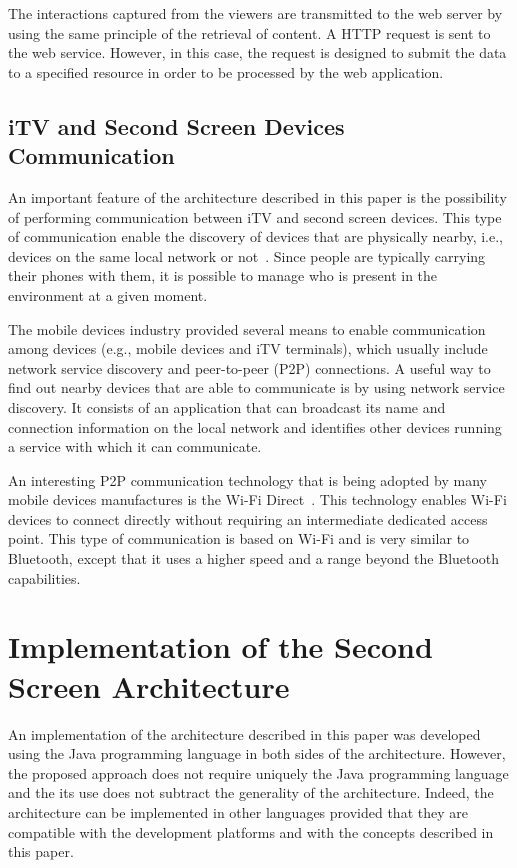 \documentclass[journal]{IEEEtran}
\begin{document}
The interactions captured from the viewers are transmitted to the web server by using the same principle of the retrieval of content. A HTTP request is sent to the web service. However, in this case, the request is designed to submit the data to a specified resource in order to be processed by the web application.

\subsection{iTV and Second Screen Devices Communication}

An important feature of the architecture described in this paper is the possibility of performing communication between iTV and second screen devices. This type of communication enable the discovery of devices that are physically nearby, i.e., devices on the same local network or not~\cite{Hellman2013}. Since people are typically carrying their phones with them, it is possible to manage who is present in the environment at a given moment.

The mobile devices industry provided several means to enable communication among devices (e.g., mobile devices and iTV terminals), which usually include network service discovery and peer-to-peer (P2P) connections. A useful way to find out nearby devices that are able to communicate is by using network service discovery. It consists of an application that can broadcast its name and connection information on the local network and identifies other devices running a service with which it can communicate.

An interesting P2P communication technology that is being adopted by many mobile devices manufactures is the Wi-Fi Direct~\cite{Hellman2013}. This technology enables Wi-Fi devices to connect directly without requiring an intermediate dedicated access point. This type of communication is based on Wi-Fi and is very similar to Bluetooth, except that it uses a higher speed and a range beyond the Bluetooth capabilities.


\section{Implementation of the Second Screen Architecture}
\label{sec_implementation}

An implementation of the architecture described in this paper was developed using the Java programming language in both sides of the architecture. However, the proposed approach does not require uniquely the Java programming language and the its use does not subtract the generality of the architecture. Indeed, the architecture can be implemented in other languages provided that they are compatible with the development platforms and with the concepts described in this paper.
\end{document}
